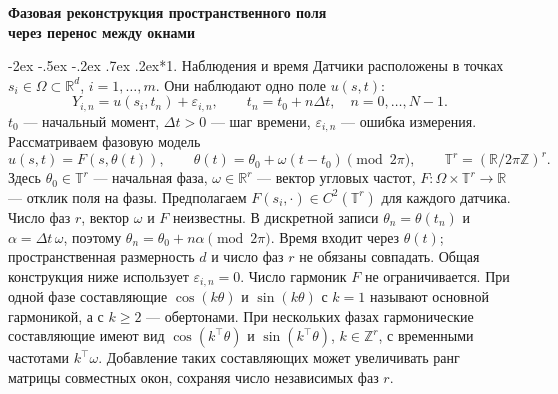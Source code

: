 \documentclass[11pt,a4paper]{article}
\makeatletter
\renewcommand\section{\@startsection{section}{1}{\z@}%
  {-2ex \@plus -.5ex \@minus -.2ex}%
  {.7ex \@plus .2ex}{\normalfont\Large\bfseries}}
\makeatother
\begin{document}
\setlength{\abovedisplayskip}{5pt}
\setlength{\belowdisplayskip}{5pt}
\setlength{\abovedisplayshortskip}{3pt}
\setlength{\belowdisplayshortskip}{5pt}
\begin{center}
{\large\bfseries Фазовая реконструкция пространственного поля\\
через перенос между окнами}
\end{center}

\section*{1. Наблюдения и время}
Датчики расположены в точках $s_i\in\Omega\subset\mathbb R^d$,
$i=1,\ldots,m$. Они наблюдают одно поле $u(s,t)$:
\begin{equation}
Y_{i,n}=u(s_i,t_n)+\varepsilon_{i,n},\qquad
 t_n=t_0+n\Delta t,\quad n=0,\ldots,N-1.
\label{eq:observations}
\end{equation}
$t_0$ --- начальный момент, $\Delta t>0$ --- шаг времени,
$\varepsilon_{i,n}$ --- ошибка измерения.
Рассматриваем фазовую модель
\begin{equation}
u(s,t)=F(s,\theta(t)),\qquad
\theta(t)=\theta_0+\omega(t-t_0)\pmod{2\pi},\qquad
\mathbb T^r=(\mathbb R/2\pi\mathbb Z)^r.
\label{eq:phase-model}
\end{equation}
Здесь $\theta_0\in\mathbb T^r$ --- начальная фаза,
$\omega\in\mathbb R^r$ --- вектор угловых частот,
$F:\Omega\times\mathbb T^r\to\mathbb R$ --- отклик поля на фазы.
Предполагаем $F(s_i,\cdot)\in C^2(\mathbb T^r)$ для каждого датчика.
Число фаз $r$, вектор $\omega$ и $F$ неизвестны.
В дискретной записи $\theta_n=\theta(t_n)$ и $\alpha=\Delta t\,\omega$,
поэтому $\theta_n=\theta_0+n\alpha\pmod{2\pi}$.
Время входит через $\theta(t)$; пространственная размерность $d$ и число фаз $r$
не обязаны совпадать. Общая конструкция ниже использует $\varepsilon_{i,n}=0$.
Число гармоник $F$ не ограничивается.
При одной фазе составляющие $\cos(k\theta)$ и $\sin(k\theta)$
с $k=1$ называют основной гармоникой, а с $k\ge2$ --- обертонами.
При нескольких фазах гармонические составляющие имеют вид
$\cos(k^\top\theta)$ и $\sin(k^\top\theta)$, $k\in\mathbb Z^r$,
с временными частотами $k^\top\omega$.
Добавление таких составляющих может увеличивать ранг матрицы совместных окон,
сохраняя число независимых фаз $r$.
\end{document}
